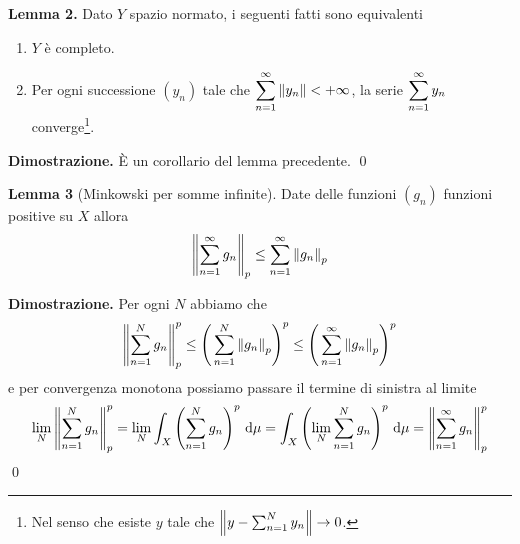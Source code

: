 \hypertarget{prop:completeness_lemma_2}{}
\textbf{Lemma 2.} 
Dato $Y$ spazio normato, i seguenti fatti sono equivalenti
\begin{enumerate}
	\item $Y$ è completo.

	\item Per ogni successione $(y_n)$ tale che $\displaystyle \sum_{n=1}^\infty \left\lVert y_n \right\rVert < +\infty$, la serie $\displaystyle \sum_{n=1}^\infty y_n$ converge\footnote{Nel senso che esiste $y$ tale che $\left\lVert y - \sum_{n=1}^N y_n \right\rVert \to 0$.}.
\end{enumerate}

\textbf{Dimostrazione.} 
È un corollario del lemma precedente. 
\qed

\hypertarget{prop:completeness_lemma_3}{}
\textbf{Lemma 3} 
(Minkowski per somme infinite). 
Date delle funzioni $(g_n)$ funzioni positive su $X$ allora
$$
\left\lVert \sum_{n=1}^\infty g_n \right\rVert_p \leq \sum_{n=1}^\infty \left\lVert g_n \right\rVert_p
$$

\textbf{Dimostrazione.}
Per ogni $N$ abbiamo che
$$
\left\lVert \sum_{n=1}^N g_n \right\rVert_p^p 
\leq \left( \,\sum_{n=1}^N \left\lVert g_n \right\rVert_p \right)^p 
\leq \left( \,\sum_{n=1}^\infty \left\lVert g_n \right\rVert_p \right)^p 
$$
e per convergenza monotona possiamo passare il termine di sinistra al limite
$$
\lim_N \left\lVert \sum_{n=1}^N g_n \right\rVert_p^p 
= \lim_N \int_X \left( \sum_{n=1}^N g_n \right)^p \,\mathrm{d} \mu
= \int_X \left( \lim_N \sum_{n=1}^N g_n \right)^p \,\mathrm{d} \mu
= \left\lVert \sum_{n=1}^\infty g_n \right\rVert_p^p
$$
\qed

